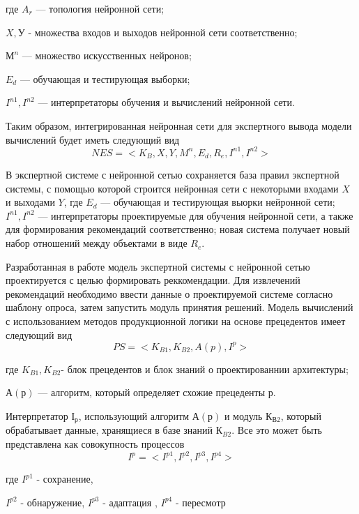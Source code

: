 где $A_r$ — топология нейронной сети; 

$X, У$ - множества входов и выходов нейронной сети соответственно; 

$М^n$ — множество искусственных нейронов; 

$E_d$ — обучающая и тестирующая выборки; 

$I^{n1}, I^{n2}$ — интерпретаторы обучения и вычислений нейронной сети.

Таким образом, интегрированная нейронная сети для экспертного вывода модели вычислений будет иметь следующий вид
\begin{equation}
    \label{eq:equation32}
    NES=<K_B,X,Y,M^n,E_d,R_e, I^{n1}, I^{n2} >
\end{equation}

В экспертной системе с нейронной сетью сохраняется база правил экспертной системы, с помощью которой строится нейронная сети с некоторыми входами $X$ и выходами $Y$, где $E_d$ — обучающая и тестирующая выорки нейронной сети;  $I^{n1}, I^{n2}$ — интерпретаторы проектируемые для обучения нейронной сети, а также для формирования рекомендаций соответственно; новая система получает новый набор отношений между объектами в виде $R_e$.

Разработанная в работе модель экспертной системы с нейронной сетью проектируется с целью формировать реккомендации. Для извлечений рекомендаций необходимо ввести данные о проектируемой системе согласно шаблону опроса, затем запустить модуль принятия решений. 
Модель вычислений с использованием методов продукционной логики на основе прецедентов имеет следующий вид
\begin{equation}
    \label{eq:equation33}
    PS=<K_{B1},K_{B2},A(p), I^p >
\end{equation}

где $K_{B1},K_{B2}$- блок прецедентов и блок знаний о проектированнии архитектуры; 

$А(р)$ — алгоритм, который определяет схожие прецеденты р.

Интерпретатор $І_р$, использующий алгоритм $А(р)$ и модуль $К_{В2}$, который обрабатывает данные, хранящиеся в базе знаний $К_{B2}$. Все это может быть представлена как совокупность процессов
\begin{equation}
    \label{eq:equation34}
    I^p = <I^{p1}, I^{p2}, I^{p3}, I^{p4}>
\end{equation}

где $I^{p1}$ - сохранение, 

$I^{p2}$ - обнаружение, 
$I^{p3}$ - адаптация , 
$I^{p4}$ - пересмотр

